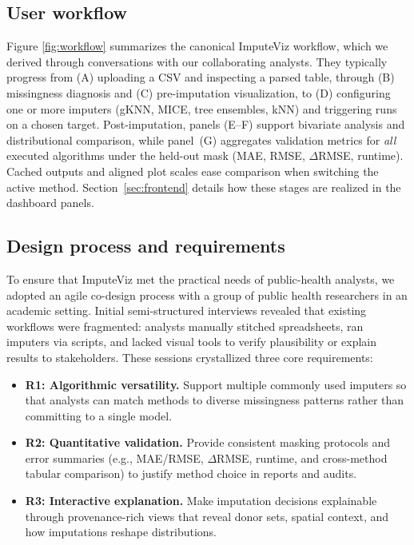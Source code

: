 \documentclass[review]{vgtc}
\newcommand{\mice}{MICE\xspace}
\newcommand{\tool}{ImputeViz\xspace}
\begin{document}
\subsection{User workflow}
\label{Uworkflow}
Figure \ref{fig:workflow} summarizes the canonical ImputeViz workflow, which we derived through conversations with our collaborating analysts. They typically progress from (A) uploading a CSV and inspecting a parsed table, through (B) missingness diagnosis and (C) pre-imputation visualization, to (D) configuring one or more imputers (gKNN, \mice, tree ensembles, kNN) and triggering runs on a chosen target. Post-imputation, panels (E--F) support bivariate analysis and distributional comparison, while panel~(G) aggregates validation metrics for \emph{all} executed algorithms under the held-out mask (MAE, RMSE, $\Delta$RMSE, runtime). Cached outputs and aligned plot scales ease comparison when switching the active method. Section~\ref{sec:frontend} details how these stages are realized in the dashboard panels.

\subsection{Design process and requirements}
To ensure that \tool met the practical needs of public-health analysts, we adopted an agile co-design process with a group of public health researchers in an academic setting. Initial semi-structured interviews revealed that existing workflows were fragmented: analysts manually stitched spreadsheets, ran imputers via scripts, and lacked visual tools to verify plausibility or explain results to stakeholders. These sessions crystallized three core requirements:

\begin{itemize}[leftmargin=*]
  \item \textbf{R1: Algorithmic versatility.} Support multiple commonly used imputers so that analysts can match methods to diverse missingness patterns rather than committing to a single model.
  \item \textbf{R2: Quantitative validation.} Provide consistent masking protocols and error summaries (e.g., MAE/RMSE, $\Delta$RMSE, runtime, and cross-method tabular comparison) to justify method choice in reports and audits.
  \item \textbf{R3: Interactive explanation.} Make imputation decisions explainable through provenance-rich views that reveal donor sets, spatial context, and how imputations reshape distributions.
\end{itemize}
\end{document}
